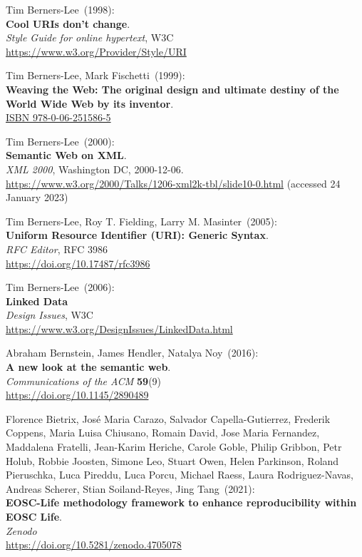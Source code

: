 \begin{thebibliography}{9}
Tim Berners-Lee~(1998): \\
\textbf{Cool {URIs} don't change}. \\
\emph{Style Guide for online hypertext}, W3C \\
\url{https://www.w3.org/Provider/Style/URI} 

Tim Berners-Lee, Mark Fischetti~(1999): \\
\textbf{Weaving the {Web}: The original design and ultimate destiny of the {World Wide Web} by its
inventor}.\\
\href{https://identifiers.org/isbn/9780062515865}{ISBN 978-0-06-251586-5}

Tim Berners-Lee~(2000): \\
\textbf{Semantic Web on XML}. \\
\emph{XML 2000}, Washington DC, 2000-12-06. \\
\url{https://www.w3.org/2000/Talks/1206-xml2k-tbl/slide10-0.html}
(accessed 24 January 2023)

Tim Berners-Lee, Roy T. Fielding, Larry M. Masinter~(2005): \\
\textbf{Uniform {Resource Identifier} ({URI}): {Generic Syntax}}.\\
\emph{RFC Editor}, RFC 3986 \\
\url{https://doi.org/10.17487/rfc3986}

Tim Berners-Lee~(2006): \\
\textbf{Linked {Data}}\\
\emph{Design Issues}, W3C \\
\url{https://www.w3.org/DesignIssues/LinkedData.html}

Abraham Bernstein, James Hendler, Natalya Noy~(2016): \\
\textbf{A new look at the semantic web}. \\
\emph{Communications of the ACM} \textbf{59}(9) \\
\url{https://doi.org/10.1145/2890489}

Florence Bietrix, José Maria Carazo, Salvador
Capella-Gutierrez, Frederik Coppens, Maria Luisa Chiusano, Romain David,
Jose Maria Fernandez, Maddalena Fratelli, Jean-Karim Heriche, Carole
Goble, Philip Gribbon, Petr Holub, Robbie Joosten, Simone Leo, Stuart
Owen, Helen Parkinson, Roland Pieruschka, Luca Pireddu, Luca Porcu,
Michael Raess, Laura Rodriguez-Navas, Andreas Scherer, Stian
Soiland-Reyes, Jing Tang~(2021): \\
\textbf{EOSC-Life methodology framework to enhance reproducibility
within EOSC Life}.\\
\emph{Zenodo}\\
\url{https://doi.org/10.5281/zenodo.4705078}


\end{thebibliography}
